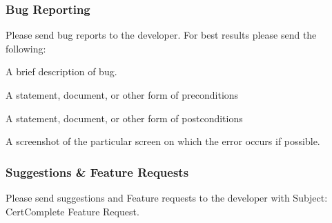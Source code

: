 \subsubsection*{Bug Reporting}

Please send bug reports to the developer. For best results please send the following\+: ~\newline

\begin{DoxyItemize}
\item A brief description of bug.
\item A statement, document, or other form of preconditions
\item A statement, document, or other form of postconditions
\item A screenshot of the particular screen on which the error occurs if possible.
\end{DoxyItemize}

\subsubsection*{Suggestions \& Feature Requests}

Please send suggestions and Feature requests to the developer with Subject\+: Cert\+Complete Feature Request. 